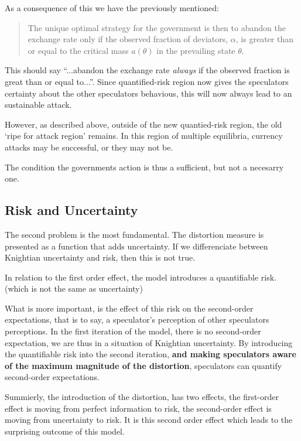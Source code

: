 \begin{refsection}
As a consequence of this we have the previously mentioned:
\begin{quotation}
	The unique optimal strategy for the government is then to abandon the exchange rate
	only if the observed fraction of deviators, $\alpha$,
	is greater than or equal to the critical mass $a(\theta)$
	in the prevailing state $\theta$.
	\parencite[p.~591]{morris1998unique}
\end{quotation}
This should say ``...abandon the exchange rate \textit{always} if the observed fraction is great than or equal to...''.
Since quantified-risk region now gives the speculators certainty about the other speculators behavious,
this will now always lead to an sustainable attack.

However, as described above, outside of the new quantied-risk region, the old `ripe for attack region' remains.
In this region of multiple equilibria, currency attacks may be successful, or they may not be.

The condition the governments action is thus a sufficient, but not a necesarry one.


\subsection{Risk and Uncertainty}
The second problem is the most fundamental. The distortion measure is presented as a function that adds uncertainty.
If we differenciate between Knightian uncertainty and risk, then this is not true.

In relation to the first order effect,
the model introduces a quantifiable risk. (which is not the same as uncertainty)

What is more important, is the effect of this risk on the second-order expectations,
that is to say, a speculator's perception of other speculators perceptions.
In the first iteration of the model, there is no second-order expectation,
we are thus in a situation of Knightian uncertainty.
By introducing the quantifiable risk into the second iteration,
\textbf{and making speculators aware of the maximum magnitude of the distortion},
speculators can quantify second-order expectations.

Summierly, the introduction of the distortion, has two effects,
the first-order effect is moving from perfect information to risk,
the second-order effect is moving from uncertainty to risk.
It is this second order effect which leads to the surprising outcome of this model.


\end{refsection}
